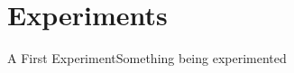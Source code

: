 \section{Experiments}


\begin{myframe}{A First Experiment}{Something being experimented}
\end{myframe}

